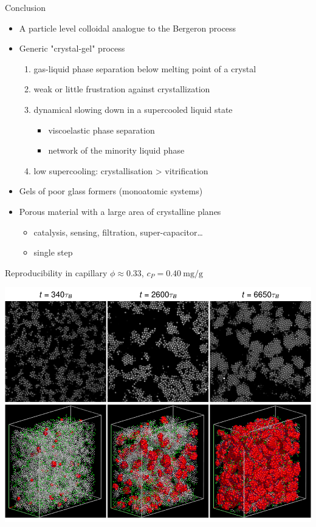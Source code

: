 \documentclass[xcolor=table]{beamer}
\begin{document}
\begin{frame}{Conclusion}
	\begin{itemize}
		\item A particle level colloidal analogue to the Bergeron process
		\item Generic "crystal-gel" process
		\begin{enumerate}
			\item gas-liquid phase separation below melting point
		of a crystal
			\item weak or little frustration against crystallization
			\item dynamical slowing down in a supercooled liquid state
			\begin{itemize}
				\item viscoelastic phase separation
				\item network of the minority liquid phase
			\end{itemize}
			\item low supercooling: crystallisation > vitrification
		\end{enumerate}
		\item Gels of poor glass formers (monoatomic systems)
		\item Porous material with a large area of crystalline planes
		\begin{itemize}
			\item catalysis, sensing, filtration, super-capacitor\ldots
			\item single step
		\end{itemize}
	\end{itemize}
\end{frame}

\appendix
{}
\setcounter{finalframe}{\value{framenumber}}

\begin{frame}[plain]
\end{frame}

\begin{frame}{Reproducibility in capillary}
	\hfill $\phi\approx 0.33$, $c_P=\SI{0.40}{\milli\gram/\gram}$
	
	\includegraphics[width=\textwidth]{nature/capillary}
\end{frame}
\end{document}
